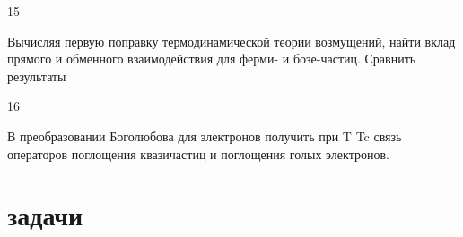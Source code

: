\documentclass[a4paper,12pt]{article} %
\begin{document}
\begin{task}

15

Вычисляя первую поправку термодинамической теории возмущений, найти вклад прямого и обменного взаимодействия для ферми- и бозе-частиц. Сравнить результаты














\end{task}


\begin{task}

16

В преобразовании Боголюбова для электронов получить при T  Tc связь операторов поглощения квазичастиц и поглощения голых электронов.














\end{task}



















\clearpage
\part{задачи}
\end{document}
